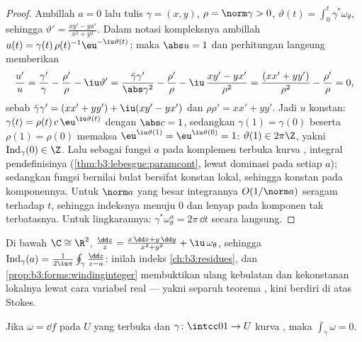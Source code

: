 \begin{proof}
Ambillah $a = 0$ lalu tulis $\gamma = (x, y)$, $\rho =
\norm\gamma > 0$, $\vartheta(t) =
\int_0^t\gamma^*\omega_\theta$, sehingga $\vartheta' =
\frac{xy' - yx'}{x^2 + y^2}$. Dalam notasi kompleksnya ambillah $u(t)
= \gamma(t)\,\rho(t)^{-1}\eu^{-\iu\vartheta(t)}$; maka
$\abs u = 1$ dan perhitungan langsung memberikan
\[
\frac{u'}{u} = \frac{\gamma'}{\gamma} - \frac{\rho'}{\rho}
- \iu\vartheta'
= \frac{\bar\gamma\gamma'}{\abs\gamma^2} -
\frac{\rho'}{\rho} - \iu\,\frac{xy' -
yx'}{\rho^2}
= \frac{(xx' + yy')}{\rho^2} - \frac{\rho'}{\rho} = 0,
\]
sebab $\bar\gamma\gamma' = (xx' + yy') + \iu(xy' - yx')$ dan
$\rho\rho' = xx' + yy'$. Jadi $u$ konstan: $\gamma(t) =
\rho(t)\,c\,\eu^{\iu\vartheta(t)}$ dengan $\abs c = 1$, sedangkan
$\gamma(1) = \gamma(0)$ beserta $\rho(1) = \rho(0)$ memaksa
$\eu^{\iu\vartheta(1)} = \eu^{\iu\vartheta(0)} = 1$:
$\vartheta(1) \in 2\pi\Z$, yakni
$\operatorname{Ind}_\gamma(0) \in \Z$. Lalu sebagai fungsi $a$
pada komplemen terbuka kurva , integral
pendefinisinya  (\cref{thm:b3:lebesgue:paramcont},
lewat dominasi pada  setiap $a$); sedangkan fungsi 
bernilai bulat bersifat konstan lokal, sehingga konstan
pada komponennya. Untuk $\norm a$ yang besar integrannya
$O(1/\norm a)$ seragam terhadap $t$, sehingga indeksnya menuju $0$
dan lenyap pada komponen tak terbatasnya. Untuk lingkarannya:
$\gamma^*\omega_\theta^a = 2\pi\,\dd t$ secara langsung.
\end{proof}

\begin{remark}
Di bawah $\C \cong \R^2$, $\frac{\dd z}{z} = \frac{x\,\dd x +
y\,\dd y}{x^2 + y^2} + \iu\,\omega_\theta$, sehingga
$\operatorname{Ind}_\gamma(a) =
\frac1{2\iu\pi}\oint_\gamma\frac{\dd z}{z - a}$: inilah
indeks \cref{ch:b3:residues}, dan
\cref{prop:b3:forms:windinginteger} membuktikan ulang
kebulatan dan kekonstanan lokalnya lewat cara variabel real ---
yakni separuh  teorema , kini berdiri di atas
Stokes.
\end{remark}

\begin{proposition}\label{prop:b3:forms:exactloop}
Jika $\omega = \dd f$  pada $U$ yang terbuka dan
$\gamma\colon\intcc01\to U$ kurva , maka
$\int_\gamma\omega = 0$.
\end{proposition}

